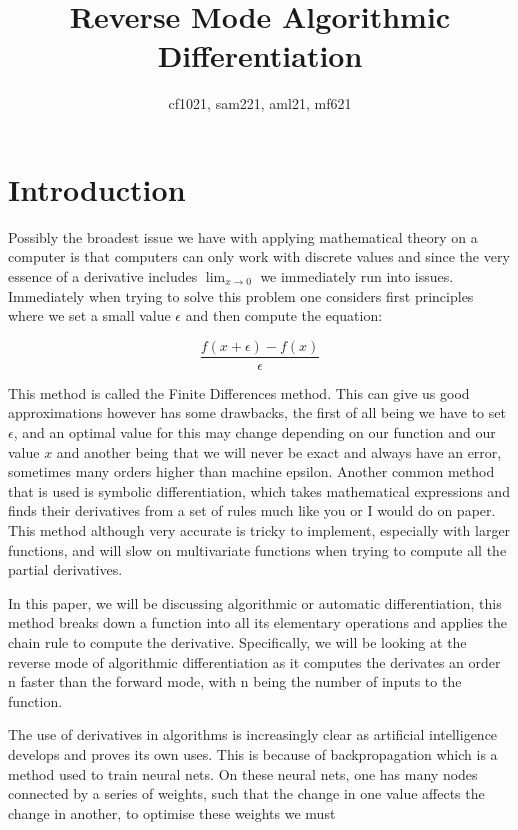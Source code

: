 \documentclass{article}
\title{Reverse Mode Algorithmic Differentiation}
\author{cf1021, sam221, aml21, mf621}
\date{}
\begin{document}
\maketitle
\tableofcontents
\newpage
\section{Introduction}

Possibly the broadest issue we have with applying mathematical theory on a computer is that computers can only work with discrete values and since the very essence of a derivative includes $\lim_{x \to 0}$ we immediately run into issues. Immediately when trying to solve this problem one considers first principles where we set a small value $\epsilon$ and then compute the equation:

\begin{equation*}
    \frac{f(x+\epsilon) - f(x)}{\epsilon}
\end{equation*}

This method is called the Finite Differences method. This can give us good approximations however has some drawbacks, the first of all being we have to set $\epsilon$, and an optimal value for this may change depending on our function and our value $x$ and another being that we will never be exact and always have an error, sometimes many orders higher than machine epsilon. Another common method that is used is symbolic differentiation, which takes mathematical expressions and finds their derivatives from a set of rules much like you or I would do on paper. This method although very accurate is tricky to implement, especially with larger functions, and will slow on multivariate functions when trying to compute all the partial derivatives.

In this paper, we will be discussing algorithmic or automatic differentiation, this method breaks down a function into all its elementary operations and applies the chain rule to compute the derivative. Specifically, we will be looking at the reverse mode of algorithmic differentiation as it computes the derivates an order n faster than the forward mode, with n being the number of inputs to the function.

The use of derivatives in algorithms is increasingly clear as artificial intelligence develops and proves its own uses. This is because of backpropagation which is a method used to train neural nets. On these neural nets, one has many nodes connected by a series of weights, such that the change in one value affects the change in another, to optimise these weights we must 
\end{document}
